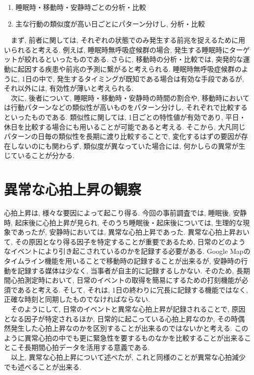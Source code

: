 \documentclass[report, 11pt, a4paper]{jsbook}
\begin{document}
\begin{enumerate}
  \item 睡眠時・移動時・安静時ごとの分析・比較
  \item 主な行動の類似度が高い日ごとにパターン分けし, 分析・比較
\end{enumerate}

　まず, 前者に関しては, それぞれの状態でのみ発生する前兆を捉えるために用いられると考える. 例えば, 睡眠時無呼吸症候群の場合, 発生する睡眠時にターゲットが絞れるといったものである. さらに, 移動時の分析・比較では, 突発的な運動に起因する疾患や前兆の予測に繋がると考えられる. 睡眠時無呼吸症候群のように, 1日の中で, 発生するタイミングが既知である場合は有効な手段であるが, それ以外には, 有効性が薄いと考えられる.\\
　次に, 後者について, 睡眠時・移動時・安静時の時間の割合や, 移動時においては行動パターンなどの類似性が高いものをパターン分けし, それぞれで比較するといったものである. 類似性に関しては, 1日ごとの特性値が有効であり, 平日・休日を比較する場合にも用いることが可能であると考える. そこから, 大凡同じパターンの日毎の類似性を長期に渡り比較することで, 変化するはずの要因が存在しないのにも関わらず, 類似度が異なっていた場合には, 何かしらの異常が生じていることが分かる. 

\section{異常な心拍上昇の観察}
心拍上昇は, 様々な要因によって起こり得る. 今回の事前調査では, 睡眠後, 安静時, 起床後に心拍上昇が見られ, そのうち睡眠後・起床後については, 生理的な現象であったが, 安静時においては, 異常な心拍上昇であった. 異常な心拍上昇おいて, その原因となり得る因子を特定することが重要であるため, 日常のどのようなイベントにより引き起こされているのかを記録する必要がある. Google Mapのタイムライン機能を用いることで移動時の記録することが出来るが, 安静時の行動を記録する媒体は少なく, 当事者が自主的に記録するしかない. そのため, 長期間心拍測定時において, 日常のイベントの取得を簡易にするための打刻機能が必須であると考える. そして, それは, 1日の終わりに冗長に記録する機能ではなく, 正確な時刻と同期したものでなければならない.\\
　そのようにして, 日常のイベントと異常な心拍上昇が記録されることで, 原因となる因子が特定されるほか, 日常的に起こっている心拍上昇なのか, その時偶然発生した心拍上昇なのかを区別することが出来るのではないかと考える. このように異常心拍の中でも更に緊急性を要するものなかを比較することが出来ることこそ長期間心拍データを活用する意義である.\\
　以上, 異常な心拍上昇について述べたが, これと同様のことが異常な心拍減少でも述べることが出来る. 
\end{document}
